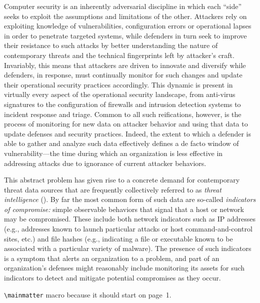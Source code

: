 \begin{dissertationintroduction}
Computer security is an inherently adversarial discipline in which
each ``side'' seeks to exploit the assumptions and limitations of the
other.  Attackers rely on exploiting knowledge of vulnerabilities,
configuration errors or operational lapses in order to penetrate
targeted systems, while defenders in turn seek to improve their
resistance to such attacks by better understanding the nature of
contemporary threats and the technical fingerprints left by attacker's
craft.  Invariably, this means that attackers are driven to innovate
and diversify while defenders, in response, must continually monitor
for such changes and update their operational security practices
accordingly.  This dynamic is present in virtually every aspect of the
operational security landscape, from anti-virus signatures to the
configuration of firewalls and intrusion detection systems to incident
response and triage.  Common to all such reifications, however, is the
process of monitoring for new data on attacker behavior and using that
data to update defenses and security practices. Indeed, the extent to
which a defender is able to gather and analyze such data effectively
defines a de facto window of vulnerability---the time during which an
organization is less effective in addressing attacks due to ignorance
of current attacker behaviors.

This abstract problem has given rise to a concrete demand for
contemporary threat data sources that are frequently collectively
referred to as \emph{threat intelligence} (\ti).  By far the most
common form of such data are so-called \emph{indicators of
  compromise:} simple observable behaviors that signal that a host or
network may be compromised.  These include both network indicators
such as IP addresses (e.g., addresses known to launch particular
attacks or host command-and-control sites, etc.) and file hashes
(e.g., indicating a file or executable known to be associated with a
particular variety of malware).  The presence of such indicators is a
symptom that alerts an organization to a problem, and part of an
organization's defenses might reasonably include monitoring its assets
for such indicators to detect and mitigate potential compromises as
they occur.

\verb!\mainmatter! macro because it should start on page~1.
\end{dissertationintroduction}
